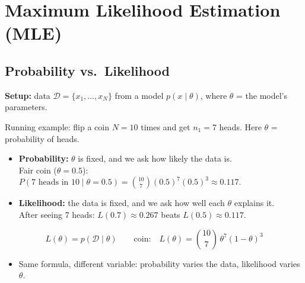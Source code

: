 \section*{Maximum Likelihood Estimation (MLE)}

\subsection*{Probability vs.\ Likelihood}
\textbf{Setup:} data $\mathcal{D} = \{x_1, \dots, x_N\}$ from a model $p(x \mid \theta)$, where $\theta$ = the model's parameters.

Running example: flip a coin $N = 10$ times and get $n_1 = 7$ heads. Here $\theta$ = probability of heads.

\begin{itemize}
  \item \textbf{Probability:} $\theta$ is fixed, and we ask how likely the data is.\\
  Fair coin ($\theta = 0.5$): $P(\text{7 heads in 10} \mid \theta = 0.5) = \binom{10}{7}(0.5)^7(0.5)^3 \approx 0.117$.
  \item \textbf{Likelihood:} the data is fixed, and we ask how well each $\theta$ explains it.\\
  After seeing 7 heads: $L(0.7) \approx 0.267$ beats $L(0.5) \approx 0.117$.
\end{itemize}
\[
L(\theta) = p(\mathcal{D} \mid \theta)
\qquad \text{coin:} \quad L(\theta) = \binom{10}{7}\,\theta^7 (1-\theta)^3
\]

\begin{itemize}
  \item Same formula, different variable: probability varies the data, likelihood varies $\theta$.
\end{itemize}

